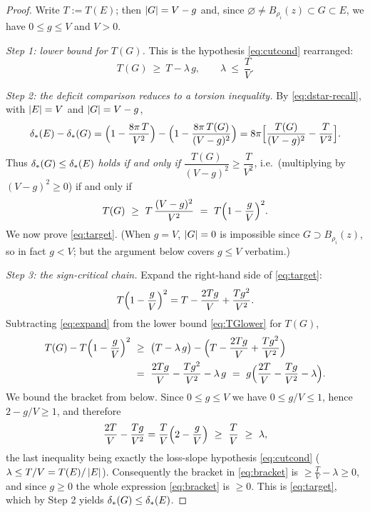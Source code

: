 \begin{proof}
Write $T:=T(E)$; then $\left\lvert G\right\rvert=V-g$ and, since $\varnothing\ne B_{\rho_i}(z)
\subset G\subset E$, we have $0\le g\le V$ and $V>0$.

\emph{Step 1: lower bound for $T(G)$.} This is the hypothesis
\eqref{eq:cutcond} rearranged:
\begin{equation}\label{eq:TGlower}
   T(G)\ \ge\ T-\lambda\,g,
   \qquad \lambda\ \le\ \frac TV .
\end{equation}

\emph{Step 2: the deficit comparison reduces to a torsion inequality.} By
\eqref{eq:dstar-recall}, with $\left\lvert E\right\rvert=V$ and $\left\lvert G\right\rvert=V-g$,
\begin{equation}\label{eq:dstar-diff}
   \delta_{*}(E)-\delta_{*}(G)
   =\Bigl(1-\frac{8\pi\,T}{V^2}\Bigr)-\Bigl(1-\frac{8\pi\,T(G)}{(V-g)^2}\Bigr)
   =8\pi\Bigl[\frac{T(G)}{(V-g)^2}-\frac{T}{V^2}\Bigr].
\end{equation}
Thus $\delta_{*}(G)\le\delta_{*}(E)$ \emph{holds if and only if}
$\dfrac{T(G)}{(V-g)^2}\ge\dfrac{T}{V^2}$, i.e.\ (multiplying by
$(V-g)^2\ge0$) if and only if
\begin{equation}\label{eq:target}
   T(G)\ \ge\ T\,\frac{(V-g)^2}{V^2}\ =\ T\Bigl(1-\frac gV\Bigr)^2 .
\end{equation}
We now prove \eqref{eq:target}. (When $g=V$, $\left\lvert G\right\rvert=0$ is impossible since
$G\supset B_{\rho_i}(z)$, so in fact $g<V$; but the argument below covers
$g\le V$ verbatim.)

\emph{Step 3: the sign-critical chain.} Expand the right-hand side of
\eqref{eq:target}:
\begin{equation}\label{eq:expand}
   T\Bigl(1-\frac gV\Bigr)^2
   =T-\frac{2Tg}{V}+\frac{Tg^2}{V^2}.
\end{equation}
Subtracting \eqref{eq:expand} from the lower bound \eqref{eq:TGlower} for
$T(G)$,
\begin{align}
   T(G)-T\Bigl(1-\frac gV\Bigr)^2
   &\ \ge\ \bigl(T-\lambda\,g\bigr)
     -\Bigl(T-\frac{2Tg}{V}+\frac{Tg^2}{V^2}\Bigr)
   \notag\\
   &\ =\ \frac{2Tg}{V}-\frac{Tg^2}{V^2}-\lambda\,g
   \ =\ g\Bigl(\frac{2T}{V}-\frac{Tg}{V^2}-\lambda\Bigr).
   \label{eq:bracket}
\end{align}
We bound the bracket from below. Since $0\le g\le V$ we have
$0\le g/V\le1$, hence $2-g/V\ge1$, and therefore
\begin{equation}\label{eq:bracket-key}
   \frac{2T}{V}-\frac{Tg}{V^2}
   =\frac TV\Bigl(2-\frac gV\Bigr)\ \ge\ \frac TV\ \ge\ \lambda,
\end{equation}
the last inequality being exactly the loss-slope hypothesis
\eqref{eq:cutcond} ($\lambda\le T/V=T(E)/\left\lvert E\right\rvert$). Consequently the bracket
in \eqref{eq:bracket} is $\ge\frac TV-\lambda\ge0$, and since $g\ge0$ the
whole expression \eqref{eq:bracket} is $\ge0$. This is \eqref{eq:target},
which by Step 2 yields $\delta_{*}(G)\le\delta_{*}(E)$.
\end{proof}

